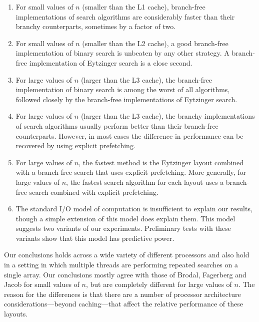 \documentclass{patmorin}
\begin{document}
\begin{enumerate}
  \item For small values of $n$ (smaller than the L1 cache), branch-free
    implementations of search algorithms are considerably faster than their
    branchy counterparts, sometimes by a factor of two.
  
  \item For small values of $n$ (smaller than the L2 cache), a good
    branch-free implementation of binary search is unbeaten by any other
    strategy.  A branch-free implementation of Eytzinger search is a
    close second.
  
  \item For large values of $n$ (larger than the L3 cache), the branch-free
    implementation of binary search is among the worst of all algorithms,
    followed closely by the branch-free implementations of Eytzinger
    search.
  
  \item For large values of $n$ (larger than the L3 cache), the branchy
    implementations of search algorithms usually perform better than their
    branch-free counterparts.  However, in most cases the difference in
    performance can be recovered by using explicit prefetching.

  \item For large values of $n$, the fastest method is the Eytzinger
   layout combined with a branch-free search that uses explicit
   prefetching.  More generally, for large values of $n$, the fastest
   search algorithm for each layout uses a branch-free search combined
   with explicit prefetching.

  \item The standard I/O model of computation \cite{aggarwal.vitter:input}
   is insufficient to explain our results, though a simple extension
   of this model does explain them.  This model suggests two variants
   of our experiments.  Preliminary tests with these variants show that
   this model has predictive power.
\end{enumerate}

Our conclusions holds across a wide variety of different processors and
also hold in a setting in which multiple threads are performing repeated
searches on a single array.  Our conclusions mostly agree with those of
Brodal, Fagerberg and Jacob for small values of $n$, but are completely
different for large values of $n$.  The reason for the differences is
that there are a number of processor architecture considerations---beyond
caching---that affect the relative performance of these layouts.
\end{document}

